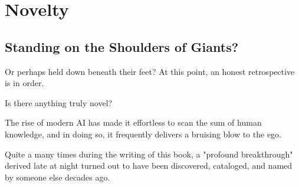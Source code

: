 \chapter{Novelty}
\label{chap:novelty}

\section{Standing on the Shoulders of Giants?}

Or perhaps held down beneath their feet? At this point, an honest retrospective is in order. 

Is there anything truly novel?

The rise of modern AI has made it effortless to scan the sum of human knowledge, and in doing so,
it frequently delivers a bruising blow to the ego.

Quite a many times during the writing of this book, a "profound breakthrough" derived late at night
turned out to have been discovered, cataloged, and named by someone else decades ago. 
